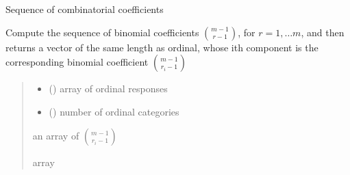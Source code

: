 \documentclass[letterpaper,10pt,english]{sphinxmanual}
\begin{document}
\begin{fulllineitems}
\label{\detokenize{cubmods:cubmods.general.kkk}}
\pysigstartsignatures
{}
\pysigstopsignatures
\sphinxAtStartPar
Sequence of combinatorial coefficients

\sphinxAtStartPar
Compute the sequence of binomial coefficients \(\binom{m-1}{r-1}\), for \(r= 1, \ldots m\), 
and then returns a vector of the same length as ordinal, whose i\sphinxhyphen{}th component is the corresponding binomial 
coefficient \(\binom{m-1}{r_i-1}\)
\begin{quote}\begin{description}
\begin{itemize}
\item {} 
\sphinxAtStartPar
{} () \textendash{} array of ordinal responses

\item {} 
\sphinxAtStartPar
{} () \textendash{} number of ordinal categories

\end{itemize}

\sphinxAtStartPar
an array of \(\binom{m-1}{r_i-1}\)

\sphinxAtStartPar
array

\end{description}\end{quote}

\end{fulllineitems}

\end{document}
